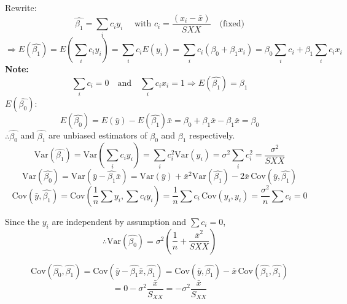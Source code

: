 \documentclass[14pt]{extarticle}
\begin{document}
Rewrite:
\[
\hat{\beta_1} = \sum_i c_i y_i
\quad \text{ with  }
c_i = \frac{(x_i - \bar{x})}{SXX} \quad \text{(fixed)}
\]
\[
\Rightarrow E(\hat{\beta_1}) = E\left(\sum_i c_i y_i\right) = \sum_i c_i E(y_i)
= \sum_i c_i (\beta_0 + \beta_1 x_i)
= \beta_0 \sum_i c_i + \beta_1 \sum_i c_i x_i
\]
\textbf{Note:}
\[
\sum_i c_i = 0 \quad \text{and} \quad \sum_i c_i x_i = 1
\Rightarrow E(\hat{\beta_1}) = \beta_1
\]
$E(\hat{\beta_0}):$
\[
E(\hat{\beta_0}) = E(\bar{y}) - E(\hat{\beta_1}) \bar{x}
= \beta_0 + \beta_1 \bar{x} - \beta_1 \bar{x}
= \beta_0
\]
$\therefore \hat{\beta_0}$ and $\hat{\beta_1}$ are unbiased estimators of $\beta_0$ and $\beta_1$ respectively.
\[
\text{Var}(\hat{\beta_1}) = \text{Var}\left(\sum_i c_i y_i\right)
= \sum_i c_i^2 \text{Var}(y_i)
= \sigma^2 \sum_i c_i^2
= \frac{\sigma^2}{SXX}
\]
\[
\text{Var}(\hat{\beta_0}) = \text{Var}(\bar{y} - \hat{\beta_1} \bar{x})
= \text{Var}(\bar{y}) + \bar{x}^2 \text{Var}(\hat{\beta_1}) - 2 \bar{x} \, \text{Cov}(\bar{y}, \hat{\beta_1})
\]
\[
\text{Cov}(\bar{y}, \hat{\beta_1}) = \text{Cov}\left(\frac{1}{n} \sum y_i, \sum c_i y_i \right)
= \frac{1}{n} \sum c_i \, \text{Cov}(y_i, y_i)
= \frac{\sigma^2}{n} \sum c_i
= 0
\]

Since the $y_i$ are independent by assumption and $\sum c_i = 0$,
\[
\therefore \text{Var}(\hat{\beta_0}) = \sigma^2 \left( \frac{1}{n} + \frac{\bar{x}^2}{SXX} \right)
\]

\[
\text{Cov}(\hat{\beta_0}, \hat{\beta_1}) = \text{Cov}\left( \bar{y} - \hat{\beta_1} \bar{x}, \hat{\beta_1} \right)
= \text{Cov}(\bar{y}, \hat{\beta_1}) - \bar{x} \, \text{Cov}(\hat{\beta_1}, \hat{\beta_1})
\]
\[
= 0 - \sigma^2 \frac{\bar{x}}{S_{XX}}
= -\sigma^2 \frac{\bar{x}}{S_{XX}}
\]
\end{document}
